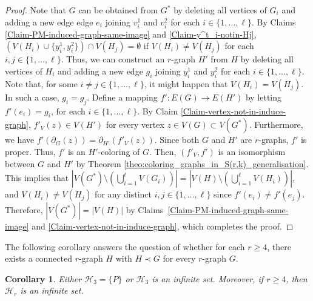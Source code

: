 \documentclass[a4paper,11pt]{article}
\newcommand{\ca}{\mathcal}
\newtheorem{cor}[defi]{Corollary}
\theoremstyle{remark}
\begin{document}
\begin{proof}
	
	Note that $G$ can be obtained from $G^*$ by deleting all vertices of $ G_i $ and adding a new edge edge $ e_ i$ joining $v^1_i$ and $v^2_i$ for each $ i\in \{1,\ldots,\ell\}$.
	By Claims \ref{Claim-PM-induced-graph-same-image} and \ref{Claim-y^t_i-notin-Hj},  $(V(H_i)\cup\{y^1_i,y^2_i\}) \cap V(H_j)  =\emptyset$ if $ V(H_i) \neq V(H_j) $ for  each $ i,j\in \{1,\ldots,\ell\}$. Thus, we can construct an $ r $-graph $ H' $  from $ H $ by deleting all vertices of $ H_i $ and adding a new edge $ g_ i$ joining $y^1_i$ and $y^2_i$ for each $ i\in \{1,\ldots,\ell\}$.  Note that, for some $i\ne j \in\{1,\dots,\ell\}$, it might happen that $ V(H_i)=V(H_j) $. In such a case, $g_i=g_j$.	Define a mapping $ f' \colon  E(G) \to E(H')$ by letting $ f'(e_i)=g_i$, for each $ i\in \{1,\ldots,\ell\}$.  By Claim \ref{Claim-vertex-not-in-induce-graph}, $ f'_V(z)\in V(H')$  for every vertex $ z  \in V(G)\subset V(G^*)$.
	Furthermore, we have $ f'(\partial_{G}(z)) =\partial_{H'}(f'_V(z))$. Since both $ G $ and $ H' $ are $ r $-graphs,  $ f'$ is proper. Thus, $ f'$ is an $ H' $-coloring of $ G$. Then, $( f'_V,  f')$ is an isomorphism between $G$ and $H'$ by Theorem \ref{theo:coloring_graphs_in_S(r,k)_generalisation}. This implies that $ |V(G^*)\setminus(\bigcup^{\ell}_{i=1}V(G_i))| =  |V(H)\setminus(\bigcup^{\ell}_{i=1}V(H_i))|  $, and $ V(H_i)\neq V(H_j)$ for any distinct $ i,j\in \{1,\ldots,\ell\}$ since $ f' (e_i)\neq  f' (e_j)$.
	Therefore, $ |V(G^*)|=|V(H)|$ by Claims~\ref{Claim-PM-induced-graph-same-image} and \ref{Claim-vertex-not-in-induce-graph}, which completes the proof.
\end{proof}




The following corollary answers the question of 
\cite{MTZ_r_graphs} whether for each $r \geq 4$, there exists a
connected $r$-graph $H$ with $H \prec G$ for every $r$-graph $G$.

\begin{cor}
	\label{cor:H_3 = P or infinite}
	Either $\ca H_3 = \{P\}$ or $\ca H_3$ is an infinite set.	
	Moreover, if $r\geq 4$, then $\ca H_r$ is an infinite set.
\end{cor}
\end{document}
